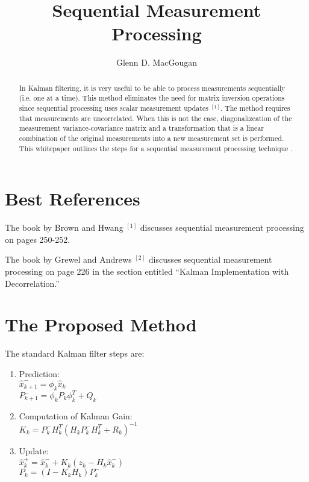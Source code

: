 \documentclass[letterpaper,11pt]{article}
\title{Sequential Measurement Processing}
\author{Glenn D. MacGougan}
\begin{document}
\maketitle

\begin{abstract}
In Kalman filtering, it is very useful to be able to process measurements sequentially (i.e. one at a time). This method eliminates the need for matrix inversion operations since sequential processing uses scalar measurement updates $^{[1]}$. The method requires that measurements are uncorrelated. When this is not the case, diagonalizeation of the measurement variance-covariance matrix and a transformation that is a linear combination of the original measurements into a new measurement set is performed. This whitepaper outlines the steps for a sequential measurement processing technique .
\end{abstract}

\section{Best References}

The book by Brown and Hwang $^{[1]}$ discusses sequential measurement processing on pages 250-252.

The book by Grewel and Andrews $^{[2]}$ discusses sequential measurement processing on page 226 in the section entitled ``Kalman Implementation with Decorrelation.''

\pagebreak

\section{The Proposed Method}

The standard Kalman filter steps are:

\begin{enumerate}
  \item Prediction: \\
         $ \hat{x}_{k+1}^- = \phi_k \hat{x}_{k} $ \\
         $ P_{k+1}^- = \phi_k P_k \phi_k^T + Q_k $
  \item Computation of Kalman Gain: \\
         $ K_k = P_k^- H_k^T ( H_k P_k^- H_k^T + R_k ) ^{-1} $
  \item Update: \\
         $ \hat{x}_k^+ = \hat{x}_k^- + K_k(z_k - H_k \hat{x}_k^- ) $\\
         $ P_k = (I-K_k H_k) P_k^- $
\end{enumerate}
\end{document}
